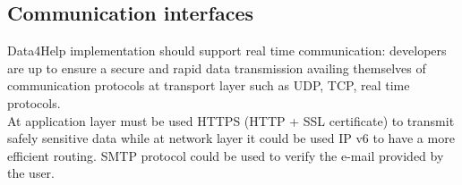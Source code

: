 \subsection{Communication interfaces}
Data4Help implementation should support real time communication: developers are up to ensure a secure and rapid data transmission availing themselves of communication protocols at transport layer such as UDP, TCP, real time protocols.  \\
At application layer must be used HTTPS (HTTP + SSL certificate) to transmit safely sensitive data while at network layer it could be used IP v6 to have a more efficient routing. 
SMTP protocol could be used to verify the e-mail provided by the user.




